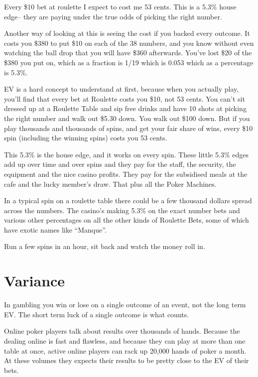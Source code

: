 Every \$10 bet at roulette I expect to cost me 53 cents. This is a 5.3\% house
edge-- they are paying under the true odds of picking the right
number.

Another way of looking at this is seeing the cost if you backed every
outcome. It costs you \$380 to put \$10 on each of the 38 numbers, and
you know without even watching the ball drop that you will have \$360
afterwards. You've lost \$20 of the \$380 you put on, which as a
fraction is 1/19 which is 0.053 which as a percentage is 5.3\%.


EV is a hard concept to understand at first, because when you actually
play, you'll find that every bet at Roulette costs you \$10, not
53 cents. You can't sit dressed up at a Roulette Table and sip free
drinks and have 10 shots at picking the right number and walk out \$5.30
down. You walk out \$100 down. But if you play thousands and thousands
of spins, and get your fair share of wins, every \$10 spin (including
the winning spins) costs you 53 cents.

This 5.3\% is the house edge, and it works on every spin. These little 5.3\%
edges add up over time and over spins and they pay for the staff, the
security, the equipment and the nice casino profits. They pay for the
subsidised meals at the cafe and the lucky member's draw. That plus
all the Poker Machines.

In a typical spin on a roulette table there could be a few thousand dollars
spread across the numbers. The casino's making 5.3\% on the exact number
bets and various other percentages on all the other kinds of Roulette Bets,
some of which have exotic names like ``Manque''.

Run a few spins in an hour, sit back and watch the money roll in.

\section{Variance}

In gambling you win or lose on a single outcome of an event,
not the long term EV. The short term luck of a single outcome
is what counts.

Online poker players talk about results over thousands of hands. Because the
dealing online is fast and flawless, and because they can play at
more than one table at once, active online players can rack up
20,000 hands of poker a month. At these volumes they expects their
results to be pretty close to the EV of their bets.

